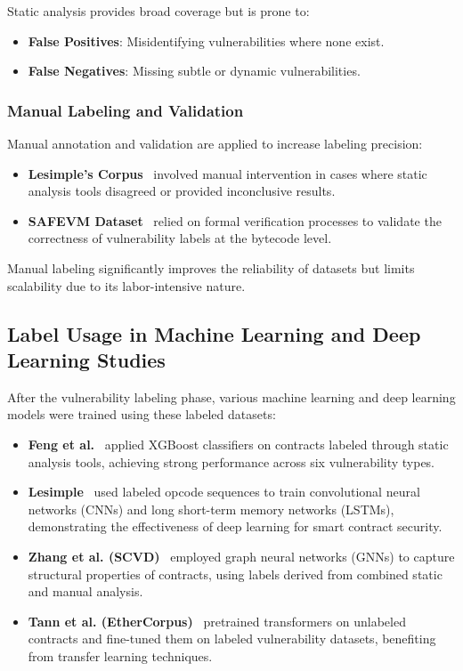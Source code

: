 Static analysis provides broad coverage but is prone to:

\begin{itemize}
    \item \textbf{False Positives}: Misidentifying vulnerabilities where none exist.
    \item \textbf{False Negatives}: Missing subtle or dynamic vulnerabilities.
\end{itemize}

\subsubsection*{Manual Labeling and Validation}

Manual annotation and validation are applied to increase labeling precision:

\begin{itemize}
    \item \textbf{Lesimple’s Corpus}~\cite{lesimple2020master} involved manual intervention in cases where static analysis tools disagreed or provided inconclusive results.
    \item \textbf{SAFEVM Dataset}~\cite{albert2019safevm} relied on formal verification processes to validate the correctness of vulnerability labels at the bytecode level.
\end{itemize}

Manual labeling significantly improves the reliability of datasets but limits scalability due to its labor-intensive nature.

\subsection{Label Usage in Machine Learning and Deep Learning Studies}

After the vulnerability labeling phase, various machine learning and deep learning models were trained using these labeled datasets:

\begin{itemize}
    \item \textbf{Feng et al.}~\cite{feng2024interpretable} applied XGBoost classifiers on contracts labeled through static analysis tools, achieving strong performance across six vulnerability types.
    \item \textbf{Lesimple}~\cite{lesimple2020master} used labeled opcode sequences to train convolutional neural networks (CNNs) and long short-term memory networks (LSTMs), demonstrating the effectiveness of deep learning for smart contract security.
    \item \textbf{Zhang et al. (SCVD)}~\cite{zhang2020scvd} employed graph neural networks (GNNs) to capture structural properties of contracts, using labels derived from combined static and manual analysis.
    \item \textbf{Tann et al. (EtherCorpus)}~\cite{tann2020towards} pretrained transformers on unlabeled contracts and fine-tuned them on labeled vulnerability datasets, benefiting from transfer learning techniques.
\end{itemize}

